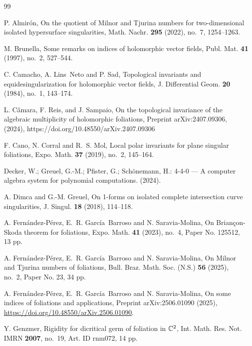 \documentclass[12pt,letterpaper]{amsart}
\begin{document}
\begin{thebibliography}{99}

P. Almir\'on, On the quotient of Milnor and Tjurina numbers for two-dimensional isolated hypersurface singularities, Math. Nachr. {\bf 295} (2022), no.~7, 1254--1263.



M. Brunella, Some remarks on indices of holomorphic vector fields, Publ. Mat. {\bf 41} (1997), no.~2, 527--544.
  
C. Camacho, A. Lins~Neto and P. Sad, Topological invariants and equidesingularization for holomorphic vector fields, J. Differential Geom. {\bf 20} (1984), no.~1, 143--174.

L. Câmara, F. Reis, and J. Sampaio, On the topological invariance of the algebraic multiplicity of holomorphic foliations, Preprint arXiv:2407.09306, (2024), 
https://doi.org/10.48550/arXiv.2407.09306

F. Cano, N. Corral and R.~S. Mol, Local polar invariants for plane singular foliations, Expo. Math. {\bf 37} (2019), no.~2, 145--164.

Decker, W.; Greuel, G.-M.; Pfister, G.; Sch{\"o}nemann, H.: 
 {4-4-0} --- {A} computer algebra system for polynomial computations.
 (2024).

A. Dimca and G.-M. Greuel, On 1-forms on isolated complete intersection curve singularities, J. Singul. {\bf 18} (2018), 114--118.



A. Fern\'andez-P\'erez, E.~R. Garc\'ia~Barroso and N. Saravia-Molina, On Brian\c con-Skoda theorem for foliations, Expo. Math. {\bf 41} (2023), no.~4, Paper No. 125512, 13 pp.


A. Fern\'andez-P\'erez, E.~R. Garc\'ia~Barroso and N. Saravia-Molina, On Milnor and Tjurina numbers of foliations, Bull. Braz. Math. Soc. (N.S.) {\bf 56} (2025), no.~2, Paper No. 23, 34 pp.

A. Fern\'andez-P\'erez, E.~R. Garc\'ia~Barroso and N. Saravia-Molina, On some indices of foliations and applications, Preprint arXiv:2506.01090 (2025), \url{https://doi.org/10.48550/arXiv.2506.01090}.


Y. Genzmer, Rigidity for dicritical germ of foliation in $\Bbb C^2$, Int. Math. Res. Not. IMRN {\bf 2007}, no.~19, Art. ID rnm072, 14 pp.


\end{thebibliography}
\end{document}
